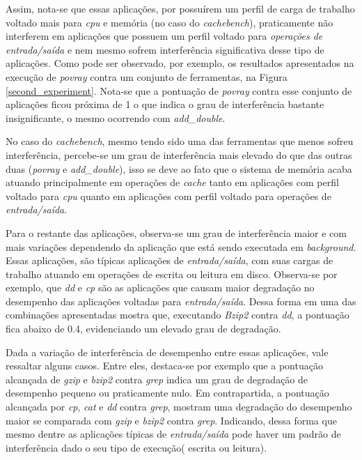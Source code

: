 \documentclass[[10pt,journal]{IEEEtran}
\begin{document}
Assim, nota-se que essas aplicações, por possuírem um perfil de carga de trabalho voltado mais para \textit{cpu} e memória (no caso do \textit{cachebench}), praticamente não interferem em aplicações que possuem um perfil voltado para \textit{operações de entrada/saída} e nem mesmo sofrem interferência significativa desse tipo de aplicações. Como pode ser observado, por exemplo, os resultados apresentados na execução de \textit{povray} contra um conjunto de ferramentas, na Figura \ref{second_experiment}. Nota-se que a pontuação de \textit{povray} contra esse conjunto de aplicações ficou próxima de 1 o que indica o grau de interferência bastante insignificante, o mesmo ocorrendo com \textit{add\_double}.

No caso do \textit{cachebench}, mesmo tendo sido uma das ferramentas que menos sofreu interferência, percebe-se um grau de interferência mais elevado do que das outras duas (\textit{povray} e \textit{add\_double}), isso se deve ao fato que o sistema de memória acaba atuando principalmente em operações de \textit{cache} tanto em aplicações com perfil voltado para \textit{cpu} quanto em aplicações com perfil voltado para operações de \textit{entrada/saída}.

Para o restante das aplicações, observa-se um grau de interferência maior e com mais variações dependendo da aplicação que está sendo executada em \textit{background}. Essas aplicações, são típicas aplicações de \textit{entrada/saída}, com suas cargas de trabalho atuando em operações de escrita ou leitura em disco. Observa-se por exemplo, que \textit{dd} e \textit{cp} são as aplicações que causam maior degradação no desempenho das aplicações voltadas para \textit{entrada/saída}. Dessa forma  em uma das combinações apresentadas mostra que, executando \textit{Bzip2} contra \textit{dd}, a pontuação fica abaixo de 0.4, evidenciando um elevado grau de degradação.

Dada a variação de interferência de desempenho entre essas aplicações, vale ressaltar alguns casos. Entre eles, destaca-se por exemplo que a pontuação alcançada de \textit{gzip} e \textit{bzip2} contra \textit{grep} indica um grau de degradação de desempenho pequeno ou praticamente nulo. Em contrapartida, a pontuação alcançada por \textit{cp}, \textit{cat} e \textit{dd} contra \textit{grep}, mostram uma degradação do desempenho maior se comparada com \textit{gzip} e \textit{bzip2} contra \textit{grep}. Indicando, dessa forma que mesmo dentre as aplicações típicas de \textit{entrada/saída} pode haver um padrão de interferência dado o seu tipo de execução( escrita ou leitura). 
\end{document}
